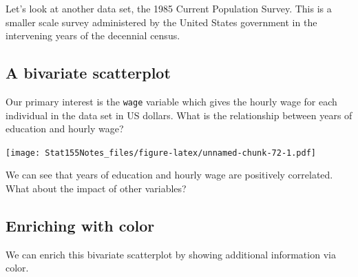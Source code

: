 \documentclass[]{book}
\newenvironment{Shaded}{\begin{snugshade}}{\end{snugshade}}
\newcommand{\CommentTok}[1]{\textcolor[rgb]{0.56,0.35,0.01}{\textit{#1}}}
\newcommand{\DataTypeTok}[1]{\textcolor[rgb]{0.13,0.29,0.53}{#1}}
\newcommand{\KeywordTok}[1]{\textcolor[rgb]{0.13,0.29,0.53}{\textbf{#1}}}
\newcommand{\NormalTok}[1]{#1}
\newcommand{\OperatorTok}[1]{\textcolor[rgb]{0.81,0.36,0.00}{\textbf{#1}}}
\newcommand{\StringTok}[1]{\textcolor[rgb]{0.31,0.60,0.02}{#1}}
\begin{document}
Let's look at another data set, the 1985 Current Population Survey. This is a smaller scale survey administered by the United States government in the intervening years of the decennial census.

\hypertarget{a-bivariate-scatterplot}{%
\subsection{A bivariate scatterplot}\label{a-bivariate-scatterplot}}

Our primary interest is the \texttt{wage} variable which gives the hourly wage for each individual in the data set in US dollars. What is the relationship between years of education and hourly wage?

\begin{Shaded}
\end{Shaded}

\texttt{[image: Stat155Notes\_files/figure-latex/unnamed-chunk-72-1.pdf]}

We can see that years of education and hourly wage are positively correlated. What about the impact of other variables?

\hypertarget{enriching-with-color}{%
\subsection{Enriching with color}\label{enriching-with-color}}

We can enrich this bivariate scatterplot by showing additional information via color.

\begin{Shaded}
\end{Shaded}
\end{document}
